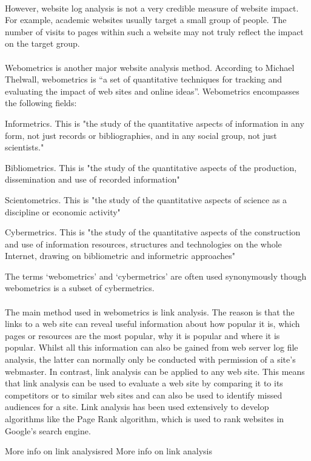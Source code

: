\paragraph{}
However, website log analysis is not a very credible measure of website impact. For example, academic websites usually target a small group of people. The number of visits to pages within such a website may not truly reflect the impact on the target group. 
\paragraph{}
Webometrics is another major website analysis method. According to Michael Thelwall, webometrics is “a set of quantitative techniques for tracking and evaluating the impact of web sites and online ideas”. Webometrics encompasses the following fields:
\begin{list}{}{}
\item Informetrics. This is "the study of the quantitative aspects of information in any form, not just records or bibliographies, and in any social group, not just scientists."
\item Bibliometrics. This is "the study of the quantitative aspects of the production, dissemination and use of recorded information"
\item Scientometrics. This is "the study of the quantitative aspects of science as a discipline or
economic activity"
\item Cybermetrics. This is "the study of the quantitative aspects of the construction and use of information resources, structures and technologies on the whole Internet, drawing on bibliometric and informetric approaches"
\end{list}
The terms ‘webometrics’ and ‘cybermetrics’ are often used synonymously though webometrics is a subset of cybermetrics.
\paragraph{}
The main method used in webometrics is link analysis. The reason is that the links to a web site can reveal useful information about how popular it is, which pages or resources are the most popular, why it is popular and where it is popular. Whilst all this information can also be gained from web server log file analysis, the latter can normally only be conducted with permission of a site’s webmaster. In contrast, link analysis can be applied to any web site. This means that link analysis can be used to evaluate a web site by comparing it to its competitors or to similar web sites and can also be used to identify missed audiences for a site. Link analysis has been used extensively to develop algorithms like the Page Rank algorithm, which is used to rank websites in Google’s search engine.
\begin{review_comment}{More info on link analysis}{red}
{More info on link analysis}
\end{review_comment}
